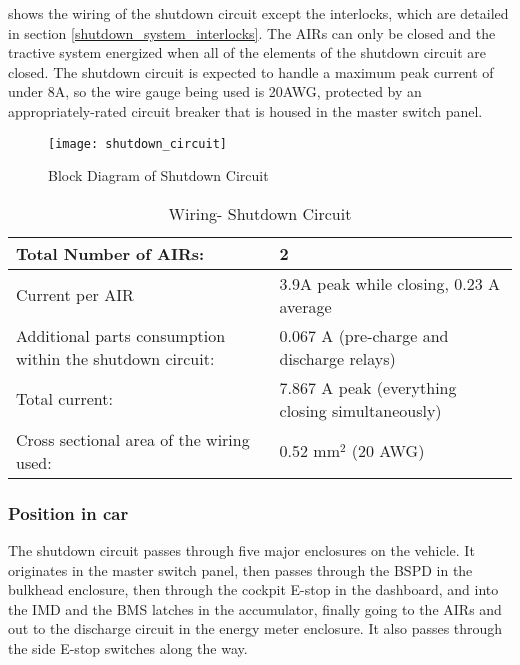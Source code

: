 \documentclass{article}
\begin{document}
	 shows the wiring of the shutdown circuit except the interlocks, which are detailed in section \ref{shutdown_system_interlocks}. The AIRs can only be closed and the tractive system energized when all of the elements of the shutdown circuit are closed. The shutdown circuit is expected to handle a maximum peak current of under 8A, so the wire gauge being used is 20AWG, protected by an appropriately-rated circuit breaker that is housed in the master switch panel. 


	\begin{sidewaysfigure}[p]
        \texttt{[image: shutdown\_circuit]}
        \caption{Block Diagram of Shutdown Circuit}
        \label{fig:shutdown_circuit}
    \end{sidewaysfigure}

	\begin{table}[H]
        \centering
        \begin{tabular}{|l|l|}
        \hline
            Total Number of AIRs: & 2 \\ \hline
            Current per AIR & 3.9A peak while closing, 0.23 A average\\ \hline
            Additional parts consumption within the shutdown circuit: & 0.067 A (pre-charge and discharge relays)  \\ \hline
            Total current: & 7.867 A peak (everything closing simultaneously) \\ \hline
            Cross sectional area of the wiring used: & 0.52 mm$^2$ (20 AWG) \\ \hline
        \end{tabular}
        \caption{Wiring- Shutdown Circuit}
        \label{ShutdownCircuitTable}
    \end{table}

\subsubsection{Position in car}
The shutdown circuit passes through five major enclosures on the vehicle. It originates in the master switch panel, then passes through the BSPD in the bulkhead enclosure, then through the cockpit E-stop in the dashboard, and into the IMD and the BMS latches in the accumulator, finally going to the AIRs and out to the discharge circuit in the energy meter enclosure. It also passes through the side E-stop switches along the way. \newline
\end{document}
